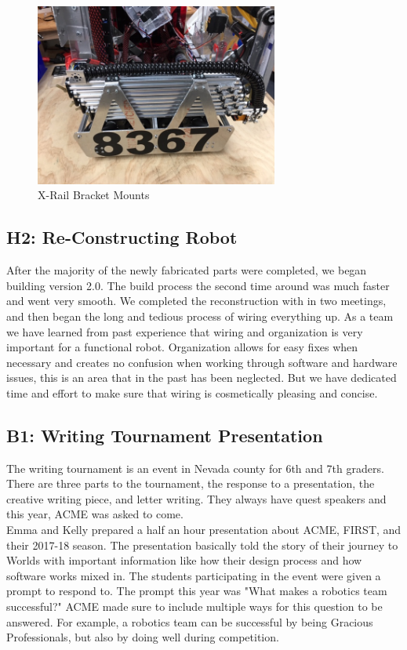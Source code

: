 \documentclass{article}
\begin{document}
\begin{figure}
    \centering
    \includegraphics[height=6cm]{18_12-31/images/X-Rail Mount.JPG}
    \caption{X-Rail Bracket Mounts}
    \label{X-Rail Mounts}
\end{figure}



\subsection{H2: Re-Constructing Robot}

After the majority of the newly fabricated parts were completed, we began building version 2.0. The build process the second time around was much faster and went very smooth. We completed the reconstruction with in two meetings, and then began the long and tedious process of wiring everything up. As a team we have learned from past experience that wiring and organization is very important for a functional robot. Organization allows for easy fixes when necessary and creates no confusion when working through software and hardware issues, this is an area that in the past has been neglected. But we have dedicated time and effort to make sure that wiring is cosmetically pleasing and concise. 
\subsection{B1: Writing Tournament Presentation}

The writing tournament is an event in Nevada county for 6th and 7th graders. There are three parts to the tournament, the response to a presentation, the creative writing piece, and letter writing. They always have quest speakers and this year, ACME was asked to come. \\

Emma and Kelly prepared a half an hour presentation about ACME, FIRST, and  their 2017-18 season. The presentation basically told the story of their journey to Worlds with important information like how their design process and how software works mixed in. The students participating in the event were given a prompt to respond to. The prompt this year was "What makes a robotics team successful?" ACME made sure to include multiple ways for this question to be answered. For example, a robotics team can be successful by being Gracious Professionals, but also by doing well during competition. \\
\end{document}

